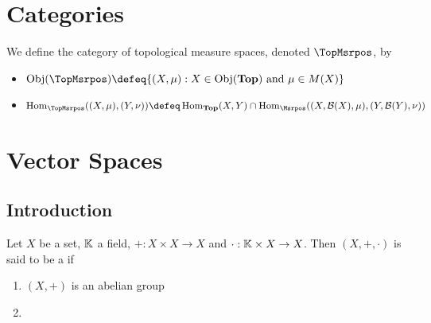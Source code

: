 \documentclass{book}
\begin{document}
	
	
	
	
	
	
	
	
	
	
	\newpage
	\chapter{Categories}
	
	
	\begin{defn}
		We define the category of topological measure spaces, denoted $\TopMsrpos$, by 
		\begin{itemize}
			\item $\Obj(\TopMsrpos) \defeq \{(X, \mu): X \in \Obj(\Top) \text{ and } \mu \in M(X)\}$			
			\item $\Hom_{\TopMsrpos}((X, \mu), (Y, \nu)) \defeq \Hom_{\Top}(X, Y) \cap \Hom_{\Msrpos}((X, \MB(X), \mu), (Y, \MB(Y), \nu))$
		\end{itemize}
	\end{defn}
	

	
	
	
	
	
	
	
	
	
	
	
	
	
	
	
	
	
	
	
	
	
	
	
	
	
	
	
	
	
	
	\newpage
	\chapter{Vector Spaces}
	
	\section{Introduction}
	
	\begin{defn}
		Let $X$ be a set, $\mathbb{K}$ a field, $+:X \times X \rightarrow X$ and $\cdot:\mathbb{K} \times X \rightarrow X$. Then $(X, +, \cdot)$ is said to be a  if 
		\begin{enumerate}
			\item $(X, +)$ is an abelian group
			\item 
		\end{enumerate} 
	\end{defn}
\end{document}
